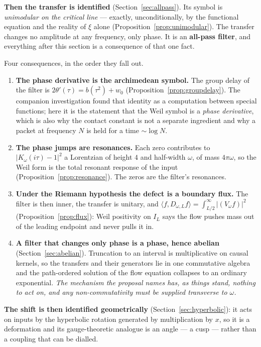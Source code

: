 \textbf{Then the transfer is identified} (Section~\ref{sec:allpass}). Its symbol
is \emph{unimodular on the critical line} --- exactly, unconditionally, by the
functional equation and the reality of $\xi$ alone (Proposition~\ref{prop:unimodular}).
The transfer changes no amplitude at any frequency, only phase. It is an
\textbf{all-pass filter}, and everything after this section is a consequence of
that one fact.

Four consequences, in the order they fall out.

\begin{enumerate}
\item \textbf{The phase derivative is the archimedean symbol.} The group delay of
the filter is $2\theta'(\tau)=b(\tau^2)+w_0$
(Proposition~\ref{prop:groupdelay}). The companion investigation found that
identity as a computation between special functions; here it is the statement
that the Weil symbol is a \emph{phase derivative}, which is also why the contact
constant is not a separate ingredient and why a packet at frequency $N$ is held
for a time $\sim\log N$.
\item \textbf{The phase jumps are resonances.} Each zero contributes to
$|K_\omega(i\tau)-1|^2$ a Lorentzian of height $4$ and half-width $\omega$, of
mass $4\pi\omega$, so the Weil form is the total resonant response of the input
(Proposition~\ref{prop:resonance}). The zeros are the filter's resonances.
\item \textbf{Under the Riemann hypothesis the defect is a boundary flux.} The
filter is then inner, the transfer is unitary, and
$\langle f,D_{\omega,L}f\rangle=\int_{L/2}^\infty|(V_\omega f)|^2$
(Proposition~\ref{prop:flux}): Weil positivity on $I_L$ says the flow pushes mass
out of the leading endpoint and never pulls it in.
\item \textbf{A filter that changes only phase is a phase, hence abelian}
(Section~\ref{sec:abelian}). Truncation to an interval is multiplicative on causal
kernels, so the transfers and their generators lie in one commutative algebra and
the path-ordered solution of the flow equation collapses to an ordinary
exponential. \emph{The mechanism the proposal names has, as things stand, nothing
to act on, and any non-commutativity must be supplied transverse to $\omega$.}
\end{enumerate}

\textbf{The shift is then identified geometrically} (Section~\ref{sec:hyperbolic}):
it acts on inputs by the hyperbolic rotation generated by multiplication by $x$,
so it is a deformation and its gauge-theoretic analogue is an angle --- a cusp ---
rather than a coupling that can be dialled.

